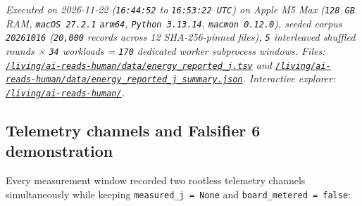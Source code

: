 \documentclass[10pt,letterpaper]{article}
\begin{document}
\emph{Executed on 2026-11-22 (\texttt{16:44:52} to
\texttt{16:53:22\ UTC}) on Apple M5 Max (\texttt{128\ GB} RAM,
\texttt{macOS\ 27.2.1} \texttt{arm64}, \texttt{Python\ 3.13.14},
\texttt{macmon\ 0.12.0}), seeded corpus \texttt{20261016}
(\texttt{20,000} records across 12 SHA-256-pinned files), \texttt{5}
interleaved shuffled rounds × \texttt{34} workloads = \texttt{170}
dedicated worker subprocess windows. Files:
\href{https://research.openie.dev/living/ai-reads-human/data/energy_reported_j.tsv}{\texttt{/\allowbreak{}living/\allowbreak{}ai-\allowbreak{}reads-\allowbreak{}human/\allowbreak{}data/\allowbreak{}energy\_\allowbreak{}reported\_\allowbreak{}j.\allowbreak{}tsv}}
and
\href{https://research.openie.dev/living/ai-reads-human/data/energy_reported_j_summary.json}{\texttt{/\allowbreak{}living/\allowbreak{}ai-\allowbreak{}reads-\allowbreak{}human/\allowbreak{}data/\allowbreak{}energy\_\allowbreak{}reported\_\allowbreak{}j\_\allowbreak{}summary.\allowbreak{}json}}.
Interactive explorer:
\href{https://research.openie.dev/living/ai-reads-human/}{\texttt{/\allowbreak{}living/\allowbreak{}ai-\allowbreak{}reads-\allowbreak{}human/\allowbreak{}}}.}

\subsection{Telemetry channels and Falsifier 6
demonstration}\label{telemetry-channels-and-falsifier-6-demonstration}

Every measurement window recorded two rootless telemetry channels
simultaneously while keeping \texttt{measured\_\allowbreak{}j\ =\ None} and
\texttt{board\_\allowbreak{}metered\ =\ false}:
\end{document}
